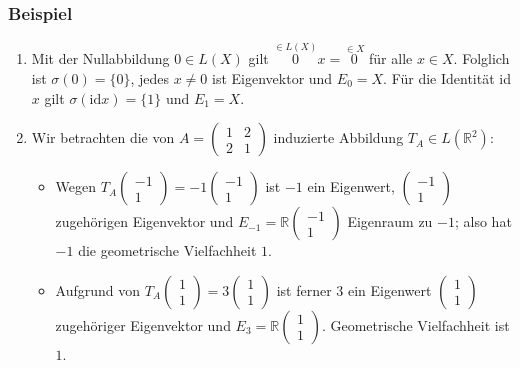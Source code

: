 \subsubsection{Beispiel}
\begin{enumerate}
\item Mit der Nullabbildung $0\in L(X)$ gilt $\stackrel{\in L(X)}{0}x=\stackrel{\in X}{0}$ für alle $x\in X$.  Folglich ist $\sigma (0) = \{0\}$, jedes $x\not=0$ ist Eigenvektor und $E_0=X$.  Für die Identität id$x$ gilt $\sigma (\mathrm{id}x)=\{1\}$ und $E_1=X$.
\item Wir betrachten die von $A=\begin{pmatrix}1 & 2\\ 2 & 1\end{pmatrix}$ induzierte Abbildung $T_A\in L(\mathbb{R}^2)$:
\begin{itemize}
\item Wegen $T_A\begin{pmatrix}-1\\ 1\end{pmatrix}=-1\begin{pmatrix}-1\\ 1\end{pmatrix}$ ist $-1$ ein Eigenwert, $\begin{pmatrix}-1\\ 1\end{pmatrix}$ zugehörigen Eigenvektor und $E_{-1}=\mathbb{R}\begin{pmatrix}-1\\ 1\end{pmatrix}$ Eigenraum zu $-1$; also hat $-1$ die geometrische Vielfachheit $1$.
\item Aufgrund von $T_A\begin{pmatrix}1\\ 1\end{pmatrix}=3\begin{pmatrix}1\\ 1\end{pmatrix}$ ist ferner $3$ ein Eigenwert $\begin{pmatrix}1\\ 1\end{pmatrix}$ zugehöriger Eigenvektor und $E_3=\mathbb{R}\begin{pmatrix}1\\ 1\end{pmatrix}$.  Geometrische Vielfachheit ist $1$.
\end{itemize}
\end{enumerate}
